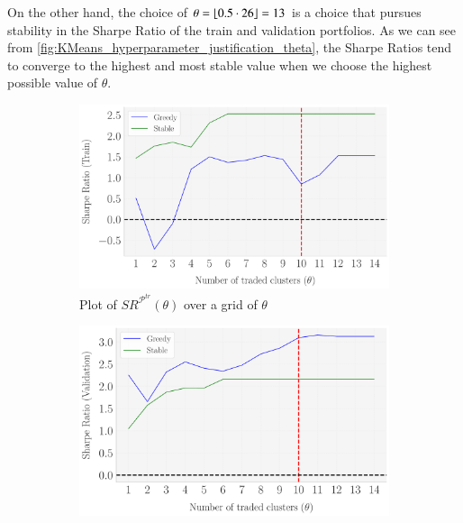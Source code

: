 
On the other hand, the choice of $\theta=\lfloor 0.5\cdot 26 \rfloor=13$ is a choice that pursues stability in the Sharpe Ratio of the train and validation portfolios. As we can see from \cref{fig:KMeans_hyperparameter_justification_theta}, the Sharpe Ratios tend to converge to the highest and most stable value when we choose the highest possible value of $\theta$. 

\begin{figure}[H]
  \caption{Sharpe Ratios in the train and validation splits as a function of $\theta$ (KMeans)}
  \centering
    \begin{subfigure}[b]{0.46\textwidth}
    \centering
    \includegraphics[width=\textwidth]{fig_LLAMA_RobustnessCheck_SR_Train_Set_vs_theta_[Change_theta].pdf}
    \caption{Plot of $SR^{\mathcal P^{tr}}(\theta)$ over a grid of $\theta$}
    \label{fig:K_hyp_3}
  \end{subfigure}
  \hspace{0.05\textwidth} %
  \begin{subfigure}[b]{0.46\textwidth}
    \centering
    \includegraphics[width=\textwidth]{fig_LLAMA_RobustnessCheck_SR_Validation_Set_vs_theta_[Change_theta].pdf}

\end{subfigure}
\end{figure}
